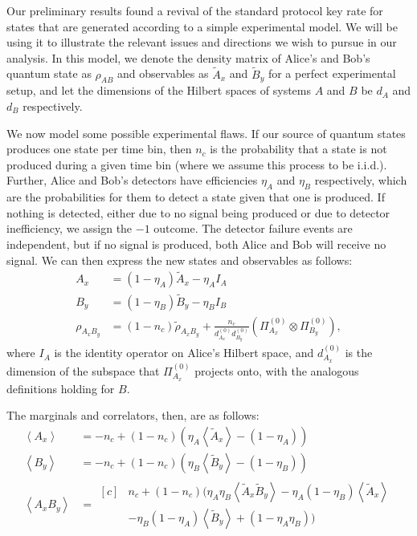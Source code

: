 \documentclass[10pt, a4paper]{article}
\numberwithin{equation}{section} %
\theoremstyle{definition}
\theoremstyle{plain}
\newcommand{\?}{\mathrel{?}} %
\newcommand{\angleb}[1]{\left\langle #1 \right\rangle} %
\begin{document}
    Our preliminary results found a revival of the standard protocol key rate for states that are generated according to a simple experimental model. We will be using it to illustrate the relevant issues and directions we wish to pursue in our analysis. In this model, we denote the density matrix of Alice's and Bob's quantum state as \(\rho_{AB}\) and observables as \(\tilde{A}_x\) and \(\tilde{B}_y\) for a perfect experimental setup, and let the dimensions of the Hilbert spaces of systems \(A\) and \(B\) be \(d_A\) and \(d_B\) respectively.

    We now model some possible experimental flaws. If our source of quantum states produces one state per time bin, then \(n_c\) is the probability that a state is not produced during a given time bin (where we assume this process to be i.i.d.). Further, Alice and Bob's detectors have efficiencies \(\eta_A\) and \(\eta_B\) respectively, which are the probabilities for them to detect a state given that one is produced. If nothing is detected, either due to no signal being produced or due to detector inefficiency, we assign the \(-1\) outcome. The detector failure events are independent, but if no signal is produced, both Alice and Bob will receive no signal. We can then express the new states and observables as follows:
    \begin{align*}
      A_x &= (1-\eta_A)\tilde{A}_x - \eta_A I_A \\
      B_y &= (1-\eta_B)\tilde{B}_y - \eta_B I_B \\
      \rho_{{A_x}{B_y}} &= (1-n_c)\tilde{\rho}_{{A_x}{B_y}} + \frac{n_c}{d^{(0)}_{A_x} d^{(0)}_{B_y}} \left( \Pi_{A_x}^{(0)} \otimes \Pi_{B_y}^{(0)} \right),
    \end{align*}
    where \(I_A\) is the identity operator on Alice's Hilbert space, and \(d^{(0)}_{A_x}\) is the dimension of the subspace that \(\Pi_{A_x}^{(0)}\) projects onto, with the analogous definitions holding for \(B\).

    The marginals and correlators, then, are as follows:
    \begin{align*}
      \angleb{A_x} &= -n_c + (1-n_c)(\eta_A\angleb{\tilde{A}_x} - (1-\eta_A)) \\
      \angleb{B_y} &= -n_c + (1-n_c)(\eta_B\angleb{\tilde{B}_y} - (1-\eta_B)) \\
      \angleb{A_x B_y} &= \begin{aligned}[c]
      & n_c + (1-n_c)(\eta_A\eta_B\angleb{\tilde{A}_x\tilde{B}_y} - \eta_A(1-\eta_B)\angleb{\tilde{A}_x} \\
      & -\eta_B(1-\eta_A)\angleb{\tilde{B}_y} + (1-\eta_A\eta_B) )
      \end{aligned}
      \end{align*}
\end{document}
